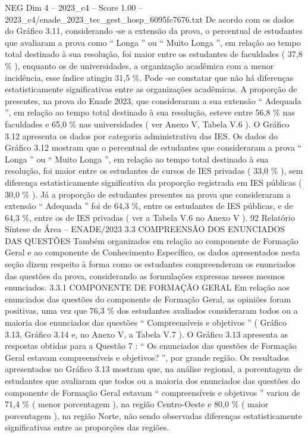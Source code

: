 \begin{textsample}{NEG Dim 4 – 2023\_c4 – Score 1.00 – 2023\_c4/enade\_2023\_tec\_gest\_hosp\_6095fc7676.txt}
De acordo com os dados do Gráfico 3.11, considerando -se a extensão da prova, o percentual de estudantes que avaliaram a prova como “ Longa ” ou “ Muito Longa ”, em relação ao tempo total destinado à sua resolução, foi maior entre os estudantes de faculdades ( 37,8 \% ), enquanto os de universidades, a organização acadêmica com a menor incidência, esse índice atingiu 31,5 \%.
Pode -se constatar que não há diferenças estatisticamente significativas entre as organizações acadêmicas.
A proporção de presentes, na prova do Enade 2023, que consideraram a sua extensão “ Adequada ”, em relação ao tempo total destinado à sua resolução, esteve entre 56,8 \% nas faculdades e 65,0 \% nas universidades ( ver Anexo V, Tabela V.6 ).
O Gráfico 3.12 apresenta os dados por categoria administrativa das IES.
Os dados do Gráfico 3.12 mostram que o percentual de estudantes que consideraram a prova “ Longa ” ou “ Muito Longa ”, em relação ao tempo total destinado à sua resolução, foi maior entre os estudantes de cursos de IES privadas ( 33,0 \% ), sem diferença estatisticamente significativa da proporção registrada em IES públicas ( 30,0 \% ).
Já a proporção de estudantes presentes na prova que consideraram a extensão “ Adequada ” foi de 64,3 \%, entre os estudantes de IES públicas, e de 64,3 \%, entre os de IES privadas ( ver a Tabela V.6 no Anexo V ). 92 Relatório Síntese de Área – ENADE/2023 3.3 COMPREENSÃO DOS ENUNCIADOS DAS QUESTÕES Também organizados em relação ao componente de Formação Geral e ao componente de Conhecimento Específico, os dados apresentados nesta seção dizem respeito à forma como os estudantes compreenderam os enunciados das questões da prova, considerando as formulações expressas nesses mesmos enunciados. 3.3.1 COMPONENTE DE FORMAÇÃO GERAL Em relação aos enunciados das questões do componente de Formação Geral, as opiniões foram positivas, uma vez que 76,3 \% dos estudantes avaliados consideraram todos ou a maioria dos enunciados das questões “ Compreensíveis e objetivos ” ( Gráfico 3.13, Gráfico 3.14 e, no Anexo V, a Tabela V.7 ).
O Gráfico 3.13 apresenta as respostas obtidas para a Questão 7 : “ Os enunciados das questões de Formação Geral estavam compreensíveis e objetivos? ”, por grande região.
Os resultados apresentados no Gráfico 3.13 mostram que, na análise regional, a porcentagem de estudantes que avaliaram que todos ou a maioria dos enunciados das questões do componente de Formação Geral estavam “ compreensíveis e objetivos ” variou de 71,4 \% ( menor porcentagem ), na região Centro-Oeste e 80,0 \% ( maior porcentagem ), na região Norte, não sendo observadas diferenças estatisticamente significativas entre as proporções das regiões.

\end{textsample}

